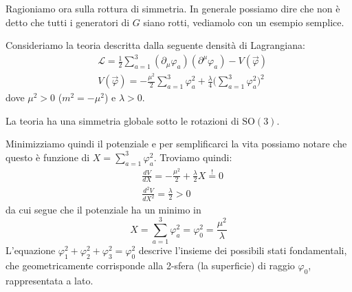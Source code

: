 \documentclass[../main.tex]{subfiles}
\begin{document}
Ragioniamo ora sulla rottura di simmetria. In generale possiamo dire che non è detto che tutti i generatori di $G$ siano rotti, vediamolo con un esempio semplice.
\begin{example}
    Consideriamo la teoria descritta dalla seguente densità di Lagrangiana:
    \begin{align*}
        &\mathscr{L} = \frac{1}{2}\sum_{a=1}^3(\partial_\mu\varphi_a) (\partial^\mu\varphi_a) - V(\Vec{\varphi})\\
        &V(\Vec{\varphi}) = -\frac{\mu^2}{2}\sum_{a=1}^3\varphi^2_a + \frac{\lambda}{4}\bigg(\sum_{a=1}^3\varphi^2_a\bigg)^2
    \end{align*}
    dove $\mu^2>0$ ($m^2=-\mu^2$) e $\lambda>0$.

    La teoria ha una simmetria globale sotto le rotazioni di $\textrm{SO}(3)$.

    Minimizziamo quindi il potenziale e per semplificarci la vita possiamo notare che questo è funzione di $X = \sum_{a=1}^3\varphi^2_a$. Troviamo quindi:
    \begin{align*}
        &\frac{dV}{dX} = -\frac{\mu^2}{2} + \frac{\lambda}{2}X \overset{!}{=} 0 \\
        &\frac{d^2V}{dX^2} = \frac{\lambda}{2} > 0
    \end{align*}
    da cui segue che il potenziale ha un minimo in 
    \[X=  \sum_{a=1}^3\varphi^2_a = \boxed{\varphi_0^2=\frac{\mu^2}{\lambda}}\]
    L'equazione $\varphi^2_1 + \varphi^2_2 + \varphi^2_3 = \varphi^2_0$ descrive l'insieme dei possibili stati fondamentali, che geometricamente corrisponde alla 2-sfera (la superficie) di raggio $\varphi_0$, rappresentata a lato.


\end{example}
\end{document}
